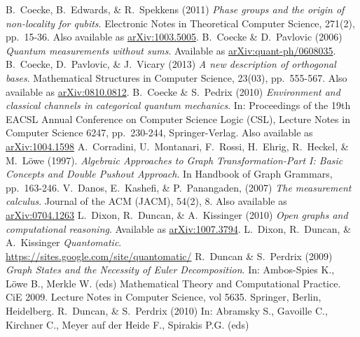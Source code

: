 \documentclass[11pt]{amsart}
\theoremstyle{remark}
\theoremstyle{definition}
\begin{document}
\begin{thebibliography}{100}
	B.~Coecke, B.~Edwards, \& R.~Spekkens
	(2011)
	\emph{Phase groups and the origin of non-locality for qubits}.
	Electronic Notes in Theoretical Computer Science,
	271(2), pp.~15-36.
	Also available as \href{https://arxiv.org/abs/1003.5005}{arXiv:1003.5005}.
	B.~Coecke \& D.~Pavlovic
	(2006)
	\emph{Quantum measurements without sums}. 
	Available as \href{https://arxiv.org/abs/quant-ph/0608035}{arXiv:quant-ph/0608035}.
	B.~Coecke, D.~Pavlovic, \& J.~Vicary
	(2013)
	\emph{A new description of orthogonal bases}. 
	Mathematical Structures in Computer Science, 23(03), pp.~555-567.
	Also available as \href{https://arxiv.org/abs/0810.0812}{arXiv:0810.0812}.
	B.~Coecke \& S.~Pedrix
	(2010)
	\emph{Environment and classical channels in categorical quantum mechanics}.
	In: Proceedings of the 19th EACSL Annual Conference on Computer Science Logic (CSL),
	Lecture Notes in Computer Science 6247, pp.~230-244,
	Springer-Verlag.
	Also available as \href{https://arxiv.org/abs/1004.1598}{arXiv:1004.1598}
	A.~Corradini, U.~Montanari, F.~Rossi, H.~Ehrig, R.~Heckel, \& M.~L\"{o}we
	(1997).
	\emph{Algebraic Approaches to Graph Transformation-Part I: Basic Concepts and Double Pushout Approach}. 
	In Handbook of Graph Grammars, pp.~163-246.
	V.~Danos, E.~Kashefi, \& P.~Panangaden,
	(2007)
	\emph{The measurement calculus}. 
	Journal of the ACM (JACM), 54(2), 8.
	Also available as \href{https://arxiv.org/abs/0704.1263}{arXiv:0704.1263}
	L.~Dixon, R.~Duncan, \& A.~Kissinger
	(2010)
	\emph{Open graphs and computational reasoning}. 
	Available as \href{https://arxiv.org/abs/1007.3794}{arXiv:1007.3794}.
	L.~Dixon, R.~Duncan, \& A.~Kissinger
	\emph{Quantomatic}. \\
	\href{https://sites.google.com/site/quantomatic/}{https://sites.google.com/site/quantomatic/}
	R.~Duncan \& S.~Perdrix 
	(2009) 
	\emph{Graph States and the Necessity of Euler Decomposition}. 
	In: Ambos-Spies K., Löwe B., Merkle W. (eds) 
	Mathematical Theory and Computational Practice. 
	CiE 2009. 
	Lecture Notes in Computer Science, vol 5635. 
	Springer, Berlin, Heidelberg.
	R.~Duncan, \& S.~Perdrix
	(2010)
	In: Abramsky S., Gavoille C., Kirchner C., Meyer auf der Heide F., Spirakis P.G. (eds)

\end{thebibliography}
\end{document}
